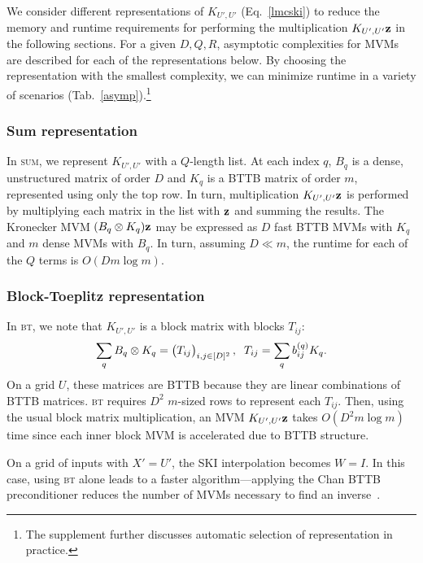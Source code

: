 \documentclass[twoside]{article}
\begin{document}
We consider different representations of $K_{{U'},{U'}}$ (Eq.~\ref{lmcski}) to reduce the memory and runtime requirements for performing the multiplication $K_{{U'},{U'}}\textbf{z}$ in the following sections. For a given $D,Q,R$, asymptotic complexities for MVMs are described for each of the representations below. By choosing the representation with the smallest complexity, we can minimize runtime in a variety of scenarios (Tab.~\ref{asymp}).\footnote{The supplement further discusses automatic selection of representation in practice.}


\subsubsection{Sum representation}
 
In \textsc{sum}, we represent $K_{{U'},{U'}}$ with a $Q$-length list. At each index $q$, $B_q$ is a dense, unstructured matrix of order $D$ and $K_q$ is a BTTB matrix of order $m$, represented using only the top row. In turn, multiplication $K_{{U'},{U'}}\textbf{z}$ is performed by multiplying each matrix in the list with $\textbf{z}$ and summing the results. The Kronecker MVM $(B_q\otimes K_q)\textbf{z}$ may be expressed as $D$ fast BTTB MVMs with $K_q$ and $m$ dense MVMs with $B_q$. In turn, assuming $D\ll m$, the runtime for each of the $Q$ terms is $O(Dm\log m)$.

\subsubsection{Block-Toeplitz representation}

In \textsc{bt}, we note that $K_{{U'},{U'}}$ is a block matrix with blocks $T_{ij}$:
\begin{align*}
\sum_qB_q\otimes K_q =\begin{pmatrix} T_{ij} \end{pmatrix}_{i,j\in[D]^2},\;\; T_{ij}=\sum_qb_{ij}^{(q)}K_q.
\end{align*}
On a grid $U$, these matrices are BTTB because they are linear combinations of BTTB matrices. \textsc{bt} requires $D^2$ $m$-sized rows to represent each $T_{ij}$. Then, using the usual block matrix multiplication, an MVM $K_{{U'},{U'}}\textbf{z}$ takes $O(D^2m\log m)$ time since each inner block MVM is accelerated due to BTTB structure.

On a grid of inputs with ${X'}={U'}$, the SKI interpolation becomes $W=I$. In this case, using \textsc{bt} alone leads to a faster algorithm---applying the Chan BTTB preconditioner reduces the number of MVMs necessary to find an inverse~\citep{chan1994circulant}.
\end{document}
